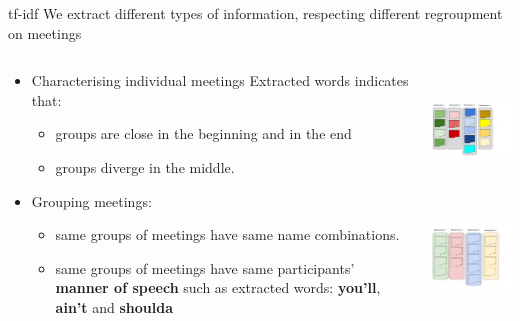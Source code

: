 \documentclass{beamer}
\begin{document}
\begin{frame}{tf-idf}
We extract different types of information, respecting different regroupment on meetings

\begin{columns}[T] %
\begin{column}[T]{7cm} %

\begin{itemize}
\item Characterising individual meetings Extracted words indicates that:
 \begin{itemize}
 	\item groups are close in the beginning and in the end
 	\item groups diverge in the middle. 
 \end{itemize}
\item Grouping meetings:
	\begin{itemize}
		\item same groups of meetings have same name combinations.
		\item same groups of meetings have same participants’ \textbf{manner of speech} such as extracted words: \textbf{you’ll}, \textbf{ain’t} and \textbf{shoulda}
\end{itemize}	 
\end{itemize}

\end{column}
%
\begin{column}[T]{4cm}
\includegraphics[height=3cm]{images/charac-tf-idf-.jpg}\\
\includegraphics[height=3.5cm]{images/group-tf-idf.jpg}

\end{column}
\end{columns}

\end{frame}
\end{document}
